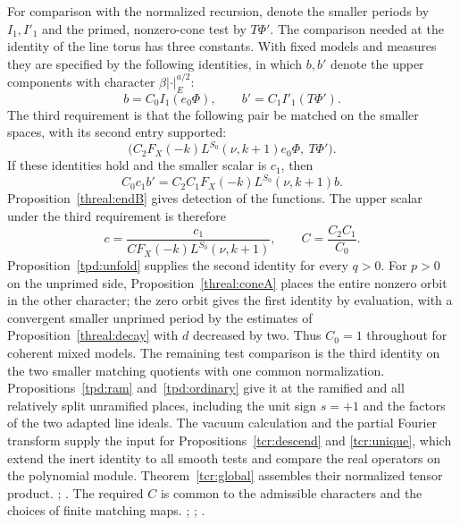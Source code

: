 For comparison with the normalized recursion, denote the smaller
periods by \(I_1,I'_1\) and the primed, nonzero-cone test by
\(T\Phi'\). The comparison needed at the identity of the line
torus has three constants. With fixed models and measures they are
specified by the following identities, in which \(b,b'\) denote
the upper components with character \(\beta|\cdot|_E^{a/2}\):
\[
 b=C_0 I_1(e_0\Phi),\qquad b'=C_1 I'_1(T\Phi').
\]
The third requirement is that the following pair be matched on the
smaller spaces, with its second entry supported:
\[
 \big(C_2 F_X(-k)L^{S_0}(\nu,k+1)e_0\Phi,\ T\Phi'\big).
\]
If these identities hold and the smaller scalar is \(c_1\), then
\[
      C_0 c_1 b'=C_2 C_1 F_X(-k)L^{S_0}(\nu,k+1)b .
\]
Proposition~\ref{threal:endB} gives detection of the functions.
The upper scalar under the third requirement is therefore
\[
 c=\frac{c_1}{C F_X(-k)L^{S_0}(\nu,k+1)},\qquad
                  C=\frac{C_2C_1}{C_0}.
\]
Proposition~\ref{tpd:unfold} supplies the second identity for every
\(q>0\). For \(p>0\) on the unprimed side,
Proposition~\ref{threal:coneA} places the entire nonzero orbit in
the other character; the zero orbit gives the first identity by
evaluation, with a convergent smaller unprimed period by the
estimates of Proposition~\ref{threal:decay} with \(d\) decreased
by two. Thus \(C_0=1\) throughout for coherent mixed models. The
remaining test comparison is the third identity on the two smaller
matching quotients with one common normalization.
Propositions~\ref{tpd:ram} and~\ref{tpd:ordinary} give it at the
ramified and all relatively split unramified places, including the
unit sign \(s=+1\) and the factors of the two adapted line ideals.
The vacuum calculation and the partial Fourier transform supply the input for Propositions~\ref{tcr:descend} and \ref{tcr:unique}, which extend the inert identity to all smooth tests and compare the real operators on the polynomial module. Theorem~\ref{tcr:global} assembles their normalized tensor product.
;
.
The required \(C\) is common to the admissible characters and
the choices of finite matching maps.
;
;
.
